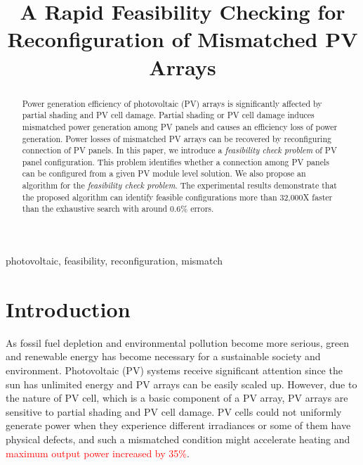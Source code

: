 \documentclass[conference]{pvsctran}
\newcommand{\zhao}{\textcolor{red}}
\begin{document}
\title{ A Rapid Feasibility Checking for Reconfiguration of Mismatched PV Arrays}

\author{ 
}

\setlength{\columnsep}{0.25in}


\maketitle


\begin{abstract}
  Power generation efficiency of photovoltaic (PV) arrays is significantly affected by partial shading and PV cell damage.
  Partial shading or PV cell damage induces mismatched power generation among PV panels and causes an efficiency loss of power generation.
  Power losses of mismatched PV arrays can be recovered by reconfiguring connection of PV panels.
  In this paper, we introduce a \textit{feasibility check problem} of PV panel configuration.
  This problem identifies whether a connection among PV panels can be configured from a given PV module level solution.
  We also propose an algorithm for the \textit{feasibility check problem}.
  The experimental results demonstrate that the proposed algorithm can identify feasible configurations more than 32,000X faster than the exhaustive search with around 0.6\% errors. 
\end{abstract}

\begin{IEEEkeywords}
photovoltaic, feasibility, reconfiguration, mismatch
\end{IEEEkeywords}

\IEEEpeerreviewmaketitle



\section{Introduction}\label{Sec1}
As fossil fuel depletion and environmental pollution become more serious, green and renewable energy has become necessary for a sustainable society and environment. 
Photovoltaic (PV) systems receive significant attention since the sun has unlimited energy and PV arrays can be easily scaled up. 
However, due to the nature of PV cell, which is a basic component of a PV array, PV arrays are sensitive to partial shading and PV cell damage. 
PV cells could not uniformly generate power when they experience different irradiances or some of them have physical defects, and such a mismatched condition might accelerate heating and %
\zhao{maximum output power increased by 35\%}.
\end{document}
